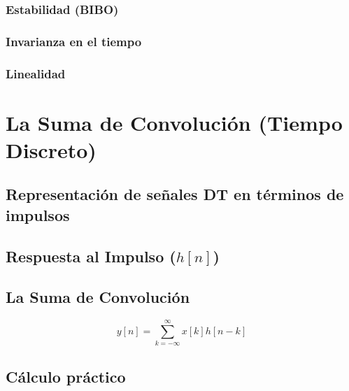 \documentclass[11pt,a4paper,openany]{book}
\begin{document}
	\subsection{Estabilidad (BIBO)}
	
	\subsection{Invarianza en el tiempo}
	
	\subsection{Linealidad}
	
	
	
	\chapter{La Suma de Convolución (Tiempo Discreto)}
	
	
	\section{Representación de señales DT en términos de impulsos}
	
	\section{Respuesta al Impulso ($h[n]$)}
	
	\section{La Suma de Convolución}
	\begin{equation}
		y[n] = \sum_{k=-\infty}^{\infty} x[k]h[n-k]
	\end{equation}
	
	\section{Cálculo práctico}
	
\end{document}
